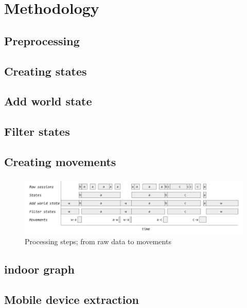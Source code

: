 \section{Methodology}\label{2-methodology}



\subsection{Preprocessing}\label{ES-preprocessing}

\subsection{Creating states}\label{ES-creatingStates}

\subsection{Add world state}\label{ES-addWorldState}

\subsection{Filter states}\label{ES-filterStates}

\subsection{Creating movements}\label{ES-creatingMovements}


\begin{figure}[H]
\centering
\includegraphics[scale=0.15]{ES-processingSteps}
\captionsetup{justification=centering}
\caption{Processing steps; from raw data to movements}
\label{figure:ES-processingSteps}
\end{figure}


\subsection{indoor graph}\label{ES-creatingMovements}

\subsection{Mobile device extraction}\label{ES-mobileDeviceExtraction}